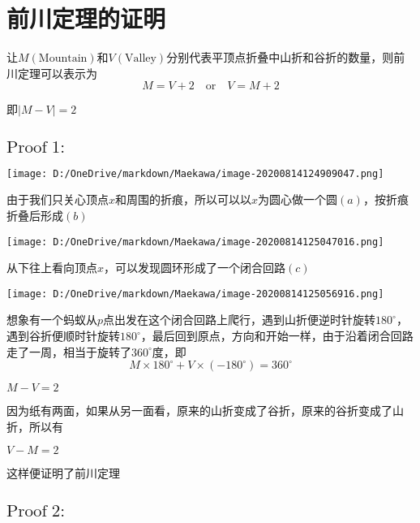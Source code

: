 \documentclass[a4paper,12pt]{article}
\begin{document}
\section{前川定理的证明}
让$M(\text{Mountain})$和$V(\text{Valley})$分别代表平顶点折叠中山折和谷折的数量，则前川定理可以表示为
\begin{equation}\label{2}
    M = V +2 \quad \text{or}\quad V = M + 2
\end{equation}
    


即$|M-V|=2$

\subsection{$\text{Proof}\;1:$}
\begin{center}
\texttt{[image: D:/OneDrive/markdown/Maekawa/image-20200814124909047.png]}
\end{center}

由于我们只关心顶点$x$和周围的折痕，所以可以以$x$为圆心做一个圆$(a)$，按折痕折叠后形成$(b)$\\

\begin{center}
\texttt{[image: D:/OneDrive/markdown/Maekawa/image-20200814125047016.png]}\\
\end{center}

从下往上看向顶点$x$，可以发现圆环形成了一个闭合回路$(c)$

\begin{center}
    \texttt{[image: D:/OneDrive/markdown/Maekawa/image-20200814125056916.png]}
\end{center}


想象有一个蚂蚁从$p$点出发在这个闭合回路上爬行，遇到山折便逆时针旋转$180^{\circ}$，遇到谷折便顺时针旋转$180^{\circ}$，最后回到原点，方向和开始一样，由于沿着闭合回路走了一周，相当于旋转了$360^{\circ}$度，即
\begin{equation}\label{1}
    M \times 180^{\circ} +V \times (-180^{\circ}) = 360^{\circ}
\end{equation}


$M - V = 2$

因为纸有两面，如果从另一面看，原来的山折变成了谷折，原来的谷折变成了山折，所以有

$V - M = 2$

这样便证明了前川定理\cite{demaine2007geometric}

\subsection{$\text{Proof}\;2:$}
\end{document}
